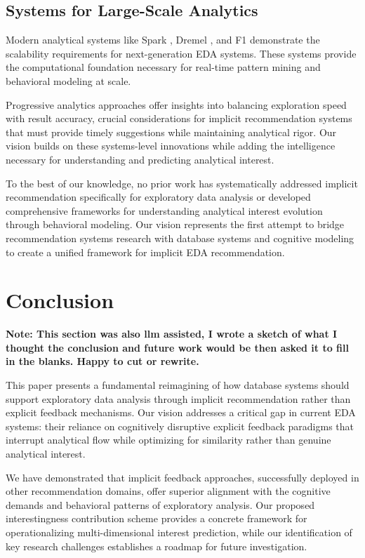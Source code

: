 \documentclass[sigconf, nonacm]{acmart}
\begin{document}
\subsection{Systems for Large-Scale Analytics}

Modern analytical systems like Spark \cite{zaharia2016apache}, Dremel \cite{melnik2010dremel}, and F1 \cite{shute2013f1} demonstrate the scalability requirements for next-generation EDA systems. These systems provide the computational foundation necessary for real-time pattern mining and behavioral modeling at scale.

Progressive analytics approaches \cite{fisher2012user, rahman2017i} offer insights into balancing exploration speed with result accuracy, crucial considerations for implicit recommendation systems that must provide timely suggestions while maintaining analytical rigor. Our vision builds on these systems-level innovations while adding the intelligence necessary for understanding and predicting analytical interest.

To the best of our knowledge, no prior work has systematically addressed implicit recommendation specifically for exploratory data analysis or developed comprehensive frameworks for understanding analytical interest evolution through behavioral modeling. Our vision represents the first attempt to bridge recommendation systems research with database systems and cognitive modeling to create a unified framework for implicit EDA recommendation.

\section{Conclusion}

\textbf{Note: This section was also llm assisted, I wrote a sketch of what I thought the conclusion and future work would be then asked it to fill in the blanks. Happy to cut or rewrite.}

This paper presents a fundamental reimagining of how database systems should support exploratory data analysis through implicit recommendation rather than explicit feedback mechanisms. Our vision addresses a critical gap in current EDA systems: their reliance on cognitively disruptive explicit feedback paradigms that interrupt analytical flow while optimizing for similarity rather than genuine analytical interest.

We have demonstrated that implicit feedback approaches, successfully deployed in other recommendation domains, offer superior alignment with the cognitive demands and behavioral patterns of exploratory analysis. Our proposed interestingness contribution scheme provides a concrete framework for operationalizing multi-dimensional interest prediction, while our identification of key research challenges establishes a roadmap for future investigation.
\end{document}
